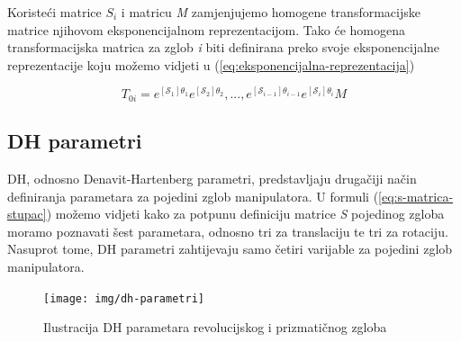 \documentclass[times, utf8, diplomskirad]{fer}
\begin{document}
Koristeći matrice \textit{$S_i$} i matricu \textit{M} zamjenjujemo homogene transformacijske matrice njihovom eksponencijalnom reprezentacijom.
Tako će homogena transformacijska matrica za zglob \textit{i} biti definirana preko svoje eksponencijalne reprezentacije koju možemo vidjeti u (\ref{eq:eksponencijalna-reprezentacija})

\begin{equation}
     T_{0i}=e^{\left[\mathcal{S}_{1}\right] \theta_{1}}  e^{\left[\mathcal{S}_{2}\right] \theta_{2}} , ..., e^{\left[\mathcal{S}_{i-1}\right] \theta_{i-1}} e^{\left[\mathcal{S}_{i}\right] \theta_{i}} M
    \label{eq:eksponencijalna-reprezentacija}
\end{equation}
\newpage
\subsection{DH parametri}
DH, odnosno Denavit-Hartenberg parametri, predstavljaju drugačiji način definiranja parametara za pojedini zglob manipulatora.
U formuli (\ref{eq:s-matrica-stupac}) možemo vidjeti kako za potpunu definiciju matrice \textit{S} pojedinog zgloba moramo poznavati šest parametara, odnosno tri za translaciju te tri za rotaciju.
Nasuprot tome, DH parametri zahtijevaju samo četiri varijable za pojedini zglob manipulatora.
\begin{figure}[H]
    \centering
    \texttt{[image: img/dh-parametri]}
    \caption{Ilustracija DH parametara revolucijskog i prizmatičnog zgloba}
    \label{fig:dh-parametri}
\end{figure}
\end{document}
